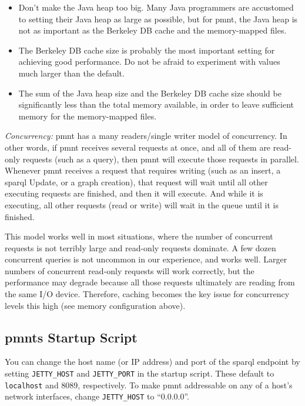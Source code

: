 \begin{itemize}
	\item Don't make the Java heap too big. Many Java programmers are accustomed to setting their Java heap as large as possible, but for \ac{pmnt}, the Java heap is not as important as the Berkeley DB cache and the memory-mapped files.

	\item The Berkeley DB cache size is probably the most important setting for achieving good performance.  Do not be afraid to experiment with values much larger than the default.

	\item The sum of the Java heap size and the Berkeley DB cache size should be significantly less than the total memory available, in order to leave sufficient memory for the memory-mapped files.
\end{itemize}

\emph{Concurrency:} \ac{pmnt} has a many readers/single writer model of concurrency.  In other words, if \ac{pmnt} receives several requests at once, and all of them are read-only requests (such as a query), then \ac{pmnt} will execute those requests in parallel.  Whenever \ac{pmnt} receives a request that requires writing (such as an insert, a \ac{sparql} Update, or a graph creation), that request will wait until all other executing requests are finished, and then it will execute. And while it is executing, all other requests (read or write) will wait in the queue until it is finished.

This model works well in most situations, where the number of concurrent requests is not terribly large and read-only requests dominate.  A few dozen concurrent queries is not uncommon in our experience, and works well.  Larger numbers of concurrent read-only requests will work correctly, but the performance may degrade because all those requests ultimately are reading from the same I/O device.  Therefore, caching becomes the key issue for concurrency levels this high (see memory configuration above).

\subsection{\acp{pmnt} Startup Script}
\label{section-pmnt-startup-script}

You can change the host name (or IP address) and port of the \ac{sparql} endpoint by setting \verb|JETTY_HOST| and \verb|JETTY_PORT| in the startup script.  These default to \verb|localhost| and 8089, respectively.  To make \ac{pmnt} addressable on any of a host's network interfaces, change \verb|JETTY_HOST| to ``0.0.0.0''.

